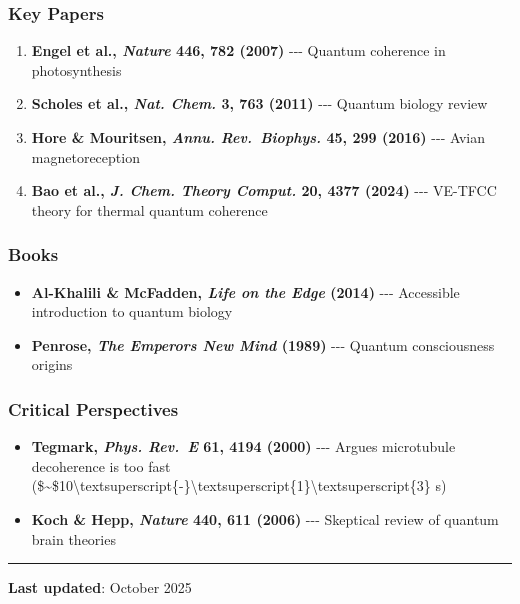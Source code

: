 \subsubsection{Key Papers}\label{key-papers}

\begin{enumerate}
\def\labelenumi{\arabic{enumi}.}
\tightlist
\item
  \textbf{Engel et al., \emph{Nature} 446, 782 (2007)} -\/-\/- Quantum
  coherence in photosynthesis
\item
  \textbf{Scholes et al., \emph{Nat. Chem.} 3, 763 (2011)} -\/-\/-
  Quantum biology review
\item
  \textbf{Hore \& Mouritsen, \emph{Annu. Rev.~Biophys.} 45, 299 (2016)}
  -\/-\/- Avian magnetoreception
\item
  \textbf{Bao et al., \emph{J. Chem. Theory Comput.} 20, 4377 (2024)}
  -\/-\/- VE-TFCC theory for thermal quantum coherence
\end{enumerate}

\subsubsection{Books}\label{books}

\begin{itemize}
\tightlist
\item
  \textbf{Al-Khalili \& McFadden, \emph{Life on the Edge} (2014)}
  -\/-\/- Accessible introduction to quantum biology
\item
  \textbf{Penrose, \emph{The Emperor\textquotesingle s New Mind} (1989)}
  -\/-\/- Quantum consciousness origins
\end{itemize}

\subsubsection{Critical Perspectives}\label{critical-perspectives}

\begin{itemize}
\tightlist
\item
  \textbf{Tegmark, \emph{Phys. Rev.~E} 61, 4194 (2000)} -\/-\/- Argues
  microtubule decoherence is too fast
  (\$\sim\$10\textbackslash textsuperscript\{-\}\textbackslash textsuperscript\{1\}\textbackslash textsuperscript\{3\}
  s)
\item
  \textbf{Koch \& Hepp, \emph{Nature} 440, 611 (2006)} -\/-\/- Skeptical
  review of quantum brain theories
\end{itemize}

\begin{center}\rule{0.5\linewidth}{0.5pt}\end{center}

\textbf{Last updated}: October 2025
